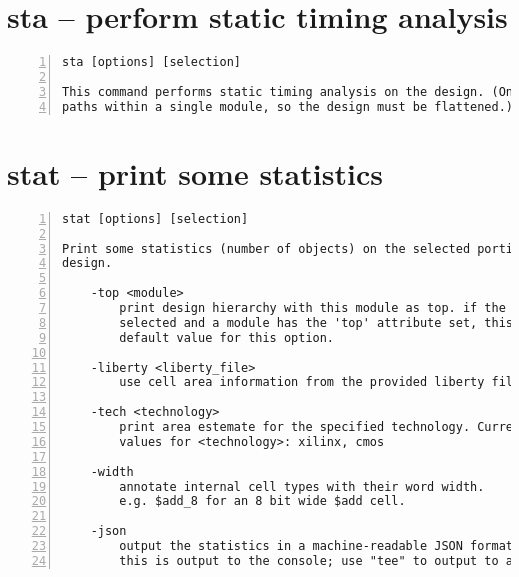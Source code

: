 \section{sta -- perform static timing analysis}
\label{cmd:sta}
\begin{lstlisting}[numbers=left,frame=single]
    sta [options] [selection]

This command performs static timing analysis on the design. (Only considers
paths within a single module, so the design must be flattened.)
\end{lstlisting}

\section{stat -- print some statistics}
\label{cmd:stat}
\begin{lstlisting}[numbers=left,frame=single]
    stat [options] [selection]

Print some statistics (number of objects) on the selected portion of the
design.

    -top <module>
        print design hierarchy with this module as top. if the design is fully
        selected and a module has the 'top' attribute set, this module is used
        default value for this option.

    -liberty <liberty_file>
        use cell area information from the provided liberty file

    -tech <technology>
        print area estemate for the specified technology. Currently supported
        values for <technology>: xilinx, cmos

    -width
        annotate internal cell types with their word width.
        e.g. $add_8 for an 8 bit wide $add cell.

    -json
        output the statistics in a machine-readable JSON format.
        this is output to the console; use "tee" to output to a file.
\end{lstlisting}

